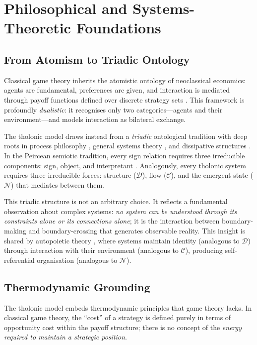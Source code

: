 \documentclass[12pt,a4paper,twocolumn]{article}
\newcommand{\N}{\mathcal{N}}
\newcommand{\D}{\mathcal{D}}
\newcommand{\CC}{\mathcal{C}}
\begin{document}
\section{Philosophical and Systems-Theoretic Foundations}
\label{sec:philosophy}

\subsection{From Atomism to Triadic Ontology}

Classical game theory inherits the atomistic ontology of neoclassical economics: agents are fundamental, preferences are given, and interaction is mediated through payoff functions defined over discrete strategy sets \citep{Mas-Colell1995}.
This framework is profoundly \emph{dualistic}: it recognises only two categories---agents and their environment---and models interaction as bilateral exchange.

The tholonic model draws instead from a \emph{triadic} ontological tradition with deep roots in process philosophy \citep{Whitehead1929}, general systems theory \citep{vonBertalanffy1968}, and dissipative structures \citep{Prigogine1984}.
In the Peircean semiotic tradition, every sign relation requires three irreducible components: sign, object, and interpretant \citep{Peirce1931}.
Analogously, every tholonic system requires three irreducible forces: structure ($\D$), flow ($\CC$), and the emergent state ($\N$) that mediates between them.

This triadic structure is not an arbitrary choice.
It reflects a fundamental observation about complex systems: \emph{no system can be understood through its constraints alone or its connections alone}; it is the interaction between boundary-making and boundary-crossing that generates observable reality.
This insight is shared by autopoietic theory \citep{Maturana1980}, where systems maintain identity (analogous to $\D$) through interaction with their environment (analogous to $\CC$), producing self-referential organisation (analogous to $\N$).

\subsection{Thermodynamic Grounding}

The tholonic model embeds thermodynamic principles that game theory lacks.
In classical game theory, the ``cost'' of a strategy is defined purely in terms of opportunity cost within the payoff structure; there is no concept of the \emph{energy required to maintain a strategic position}.
\end{document}
